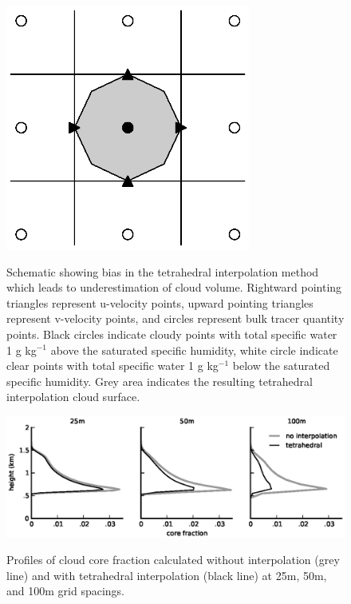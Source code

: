 \documentclass[12pt]{article}
\begin{document}
\begin{figure}[t]
  \noindent
  \includegraphics[width=19pc,angle=0]{./figures/interpolation_bias}\\ 
  \caption{Schematic showing bias in the tetrahedral interpolation method 
  which leads to underestimation of cloud volume.  Rightward pointing 
  triangles represent u-velocity points, upward pointing triangles represent 
  v-velocity points, and circles represent bulk tracer quantity points.
  Black circles indicate cloudy points with total specific water 1 g 
  kg$^{-1}$ above the saturated specific humidity, white circle indicate 
  clear points with total specific water 1 g kg$^{-1}$ below the 
  saturated specific humidity.  Grey area indicates the resulting tetrahedral
  interpolation cloud surface.
  }
  \label{fig:interpolation_bias}
\end{figure}

\begin{figure}[t]
  \noindent
  \includegraphics[width=40pc,angle=0]{./figures/area_comparison}\\ 
  \caption{Profiles of cloud core fraction calculated without interpolation 
  (grey line) and with tetrahedral interpolation (black line) at 25m, 50m, 
  and 100m grid spacings.
  }
  \label{fig:area_comparison}
\end{figure}
\end{document}

